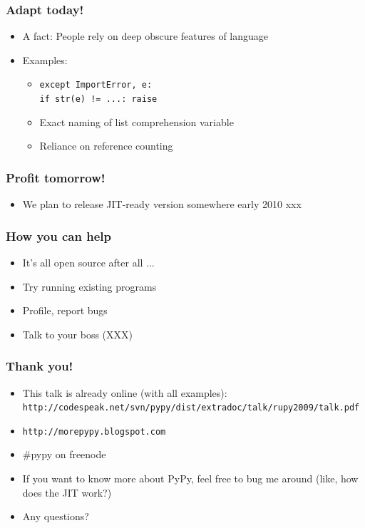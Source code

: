 \documentclass[utf8x]{beamer}
\begin{document}
\begin{frame}
  \frametitle{Adapt today!}
  \begin{itemize}
    \item A fact: People rely on deep obscure features of language
    \item Examples:
      \pause
      \begin{itemize}
        \item {\tt except ImportError, e: \\ \quad if str(e) != ...:
          raise}
          \pause
        \item Exact naming of list comprehension variable
          \pause
        \item Reliance on reference counting
      \end{itemize}
  \end{itemize}
\end{frame}

\begin{frame}
  \frametitle{Profit tomorrow!}
  \begin{itemize}
    \item We plan to release JIT-ready version somewhere early 2010
      xxx
  \end{itemize}
\end{frame}

\begin{frame}
  \frametitle{How you can help}
  \begin{itemize}
    \item It's all open source after all ...
    \item Try running existing programs
    \item Profile, report bugs
      \pause
    \item Talk to your boss (XXX)
  \end{itemize}
\end{frame}

\begin{frame}
  \frametitle{Thank you!}
  \begin{itemize}
    \item This talk is already online (with all examples):
      {\tt http://codespeak.net/svn/pypy/dist/extradoc/talk/rupy2009/talk.pdf}
    \item {\tt http://morepypy.blogspot.com}
    \item \#pypy on freenode
    \item If you want to know more about PyPy, feel free to bug me
      around (like, how does the JIT work?)
    \item Any questions?
  \end{itemize}
\end{frame}
\end{document}
